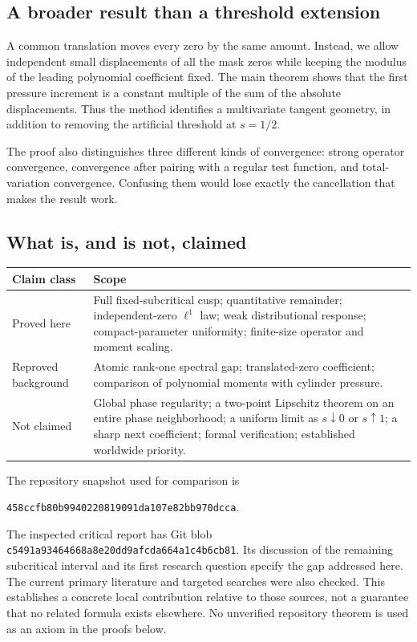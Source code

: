\documentclass[11pt,a4paper]{article}
\numberwithin{equation}{section}
\theoremstyle{definition}
\theoremstyle{remark}
\begin{document}
\subsection{A broader result than a threshold extension}
A common translation moves every zero by the same amount. Instead,
we allow independent small displacements of all the mask zeros while
keeping the modulus of the leading polynomial coefficient fixed. The
main theorem shows that the first pressure increment is a constant
multiple of the sum of the absolute displacements. Thus the method
identifies a multivariate tangent geometry, in addition to removing the
artificial threshold at $s=1/2$.

The proof also distinguishes three different kinds of convergence:
strong operator convergence, convergence after pairing with a regular
test function, and total-variation convergence. Confusing them would
lose exactly the cancellation that makes the result work.

\subsection{What is, and is not, claimed}
\begin{center}
\begin{tabular}{@{}p{}p{}@{}}
\toprule
\textbf{Claim class}&\textbf{Scope}\\
\midrule
Proved here & Full fixed-subcritical cusp; quantitative remainder;
independent-zero $\ell^1$ law; weak distributional response; compact-parameter
uniformity; finite-size operator and moment scaling.\\[2mm]
Reproved background & Atomic rank-one spectral gap; translated-zero
coefficient; comparison of polynomial moments with cylinder pressure.\\[2mm]
Not claimed & Global phase regularity; a two-point Lipschitz theorem on
an entire phase neighborhood; a uniform limit as $s\downarrow0$ or
$s\uparrow1$; a sharp next coefficient; formal verification; established
worldwide priority.\\
\bottomrule
\end{tabular}
\end{center}

The repository snapshot used for comparison is
\begin{center}\small
\nolinkurl{458ccfb80b9940220819091da107e82bb970dcca}.
\end{center}
The inspected critical report has Git blob
\nolinkurl{c5491a93464668a8e20dd9afcda664a1c4b6cb81}. Its discussion of the
remaining subcritical interval and its first research question specify
the gap addressed here. The current primary literature and targeted
searches were also checked. This establishes a concrete local
contribution relative to those sources, not a guarantee that no related
formula exists elsewhere. No unverified repository theorem is used as
an axiom in the proofs below.
\end{document}
